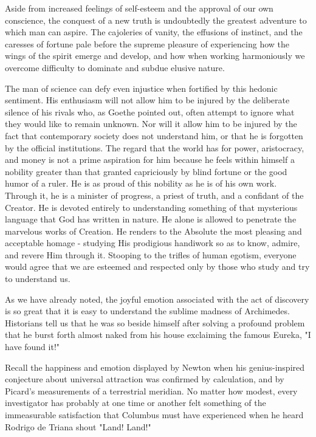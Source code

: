 \documentclass{article}
\begin{document}
Aside from increased feelings of self-esteem and the approval of our own conscience, the conquest of a new truth is undoubtedly the greatest adventure to which man can aspire. The cajoleries of vanity, the effusions of instinct, and the caresses of fortune pale before the supreme pleasure of experiencing how the wings of the spirit emerge and develop, and how when working harmoniously we overcome difficulty to dominate and subdue elusive nature.

The man of science can defy even injustice when fortified by this hedonic sentiment. His enthusiasm will not allow him to be injured by the deliberate silence of his rivals who, as Goethe pointed out, often attempt to ignore what they would like to remain unknown. Nor will it allow him to be injured by the fact that contemporary society does not understand him, or that he is forgotten by the official institutions. The regard that the world has for power, aristocracy, and money is not a prime aspiration for him because he feels within himself a nobility greater than that granted capriciously by blind fortune or the good humor of a ruler. He is as proud of this nobility as he is of his own work. Through it, he is a minister of progress, a priest of truth, and a confidant of the Creator. He is devoted entirely to understanding something of that mysterious language that God has written in nature. He alone is allowed to penetrate the marvelous works of Creation. He renders to the Absolute the most pleasing and acceptable homage - studying His prodigious handiwork so as to know, admire, and revere Him through it. Stooping to the trifles of human egotism, everyone would agree that we are esteemed and respected only by those who study and try to understand us.

As we have already noted, the joyful emotion associated with the act of discovery is so great that it is easy to understand the sublime madness of Archimedes. Historians tell us that he was so beside himself after solving a profound problem that he burst forth almost naked from his house exclaiming the famous Eureka, "I have found it!"

Recall the happiness and emotion displayed by Newton when his genius-inspired conjecture about universal attraction was confirmed by calculation, and by Picard’s measurements of a terrestrial meridian. No matter how modest, every investigator has probably at one time or another felt something of the immeasurable satisfaction that Columbus must have experienced when he heard Rodrigo de Triana shout "Land! Land!"
\end{document}
